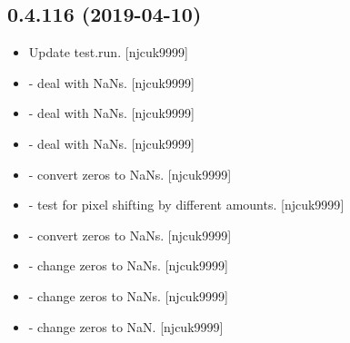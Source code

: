 \documentclass[a4paper,10pt,english]{report}
\begin{document}
\subsection{0.4.116 (2019-04-10)}
\label{\detokenize{misc/changelog:id144}}\begin{itemize}
\item {} 
Update test.run. {[}njcuk9999{]}

\item {} 
 - deal with NaNs. {[}njcuk9999{]}

\item {} 
 - deal with NaNs. {[}njcuk9999{]}

\item {} 
 - deal with NaNs. {[}njcuk9999{]}

\item {} 
 - convert zeros to NaNs. {[}njcuk9999{]}

\item {} 
 - test for pixel shifting by different amounts.
{[}njcuk9999{]}

\item {} 
 - convert zeros to NaNs. {[}njcuk9999{]}

\item {} 
 - change zeros to NaNs. {[}njcuk9999{]}

\item {} 
 - change zeros to NaNs. {[}njcuk9999{]}

\item {} 
 - change zeros to NaN. {[}njcuk9999{]}

\end{itemize}
\end{document}
